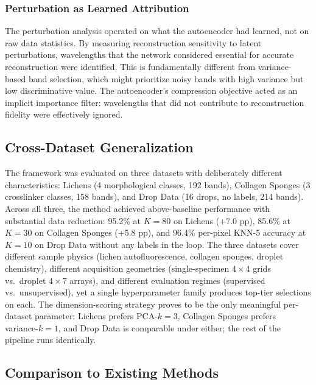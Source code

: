 \subsubsection{Perturbation as Learned Attribution}
The perturbation analysis operated on what the autoencoder had learned, not on raw data statistics.
By measuring reconstruction sensitivity to latent perturbations, wavelengths that the network considered essential for accurate reconstruction were identified.
This is fundamentally different from variance-based band selection, which might prioritize noisy bands with high variance but low discriminative value.
The autoencoder's compression objective acted as an implicit importance filter: wavelengths that did not contribute to reconstruction fidelity were effectively ignored.

\subsection{Cross-Dataset Generalization}
\label{sec:discussion_cross_dataset}

The framework was evaluated on three datasets with deliberately different characteristics: Lichens (4 morphological classes, 192 bands), Collagen Sponges (3 crosslinker classes, 158 bands), and Drop Data (16 drops, no labels, 214 bands).
Across all three, the method achieved above-baseline performance with substantial data reduction: 95.2\% at $K=80$ on Lichens (+7.0 pp), 85.6\% at $K=30$ on Collagen Sponges (+5.8 pp), and 96.4\% per-pixel KNN-5 accuracy at $K=10$ on Drop Data without any labels in the loop.
The three datasets cover different sample physics (lichen autofluorescence, collagen sponges, droplet chemistry), different acquisition geometries (single-specimen $4{\times}4$ grids vs.\ droplet $4{\times}7$ arrays), and different evaluation regimes (supervised vs.\ unsupervised), yet a single hyperparameter family produces top-tier selections on each.
The dimension-scoring strategy proves to be the only meaningful per-dataset parameter: Lichens prefers PCA-$k{=}3$, Collagen Sponges prefers variance-$k{=}1$, and Drop Data is comparable under either; the rest of the pipeline runs identically.

\subsection{Comparison to Existing Methods}
\label{sec:discussion_sota}

